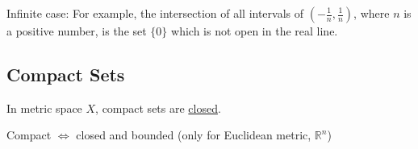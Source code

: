 \documentclass{article}
\begin{document}
        Infinite case: For example, the intersection of all intervals of $( -\frac{1}{n}, \frac{1}{n})$, where $n$ is a positive number, is the set $\{ 0 \}$ which is not open in the real line.

    \subsection{Compact Sets}

        In metric space $X$, compact sets are \underline{closed}.

        Compact $\Leftrightarrow$ closed and bounded (only for Euclidean metric, $\mathbb{R}^{n}$)
\end{document}
